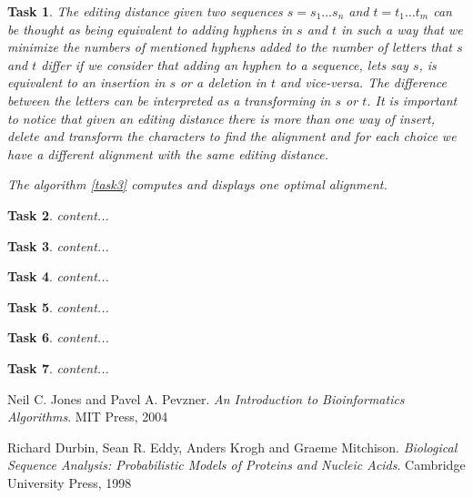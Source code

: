 \documentclass[10pt]{article} %
\theoremstyle{problemstyle}
\newtheorem{exercise}{Task}	%
\begin{document}
\begin{exercise} %
The editing distance given two sequences $s=s_1\dots s_n$ and $t=t_1\dots t_m$ can be thought as being equivalent to adding hyphens in $s$ and $t$ in such a way that we minimize the numbers of mentioned hyphens added to the number of letters that $s$ and $t$ differ if we consider that adding an hyphen to a sequence, lets say $s$, is equivalent to an insertion in $s$ or a deletion in $t$ and vice-versa. The difference between the letters can be interpreted as a transforming in $s$ or $t$. It is important to notice that given an editing distance there is more than one way of insert, delete and transform the characters to find the alignment and for each choice we have a different alignment with the same editing distance.

The algorithm \ref{task3} computes and displays one optimal alignment.
 
\end{exercise}

\begin{exercise} %
	content...
\end{exercise}

\begin{exercise} %
	content...
\end{exercise}

\begin{exercise} %
	content...
\end{exercise}

\begin{exercise} %
	content...
\end{exercise}

\begin{exercise} %
	content...
\end{exercise}

\begin{exercise} %
	content...
\end{exercise}

\begin{thebibliography}{3}
	
	Neil C. Jones and Pavel A. Pevzner. 
	\textit{An Introduction to Bioinformatics Algorithms}. 
	MIT Press, 2004
	
	Richard Durbin, Sean R. Eddy, Anders Krogh and Graeme Mitchison. 
	\textit{Biological Sequence Analysis: Probabilistic Models of Proteins and Nucleic Acids}. 
	Cambridge University Press, 1998
	
\end{thebibliography}
\end{document}
